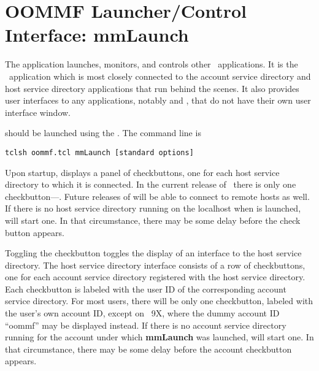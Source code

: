 \section{OOMMF Launcher/Control Interface: mmLaunch}\label{sec:mmlaunch}

\begin{center}
\end{center}

The application  launches, monitors, and controls other 
\OOMMF\ applications.  It is the \OOMMF\ application which is
most closely connected to the account service directory and host
service directory applications that run behind the scenes.  It also
provides user interfaces
to any applications, notably
 and
, that do not have their own user interface
window.

 should be launched using the .  The command
line is
\begin{verbatim}
tclsh oommf.tcl mmLaunch [standard options]
\end{verbatim}

Upon startup,  displays a panel of checkbuttons, one for
each host service directory
to which it is connected.  In the current
release of \OOMMF\ there is only one checkbutton---.
Future releases of  will be able to connect to remote
hosts as well.  If there is no host service directory running on the
localhost when  is launched,
 will start one.  In that circumstance, there may be 
some delay before the  check button appears.

Toggling the  checkbutton toggles the display of an
interface to the host service directory.  The host service directory
interface consists of a row of checkbuttons, one for each account
service directory
registered with the host service directory.  Each
checkbutton is labeled with the user ID
of the corresponding account
service directory.  For most users, there will be only one
checkbutton, labeled with the user's own account ID, except on
\Windows~9X, where the dummy account ID 
``oommf'' may be displayed
instead.  If there is no account service directory running for the
account under which {\bf mmLaunch} was launched,  will
start one.  In that circumstance, there may be some delay before the
account checkbutton appears.

